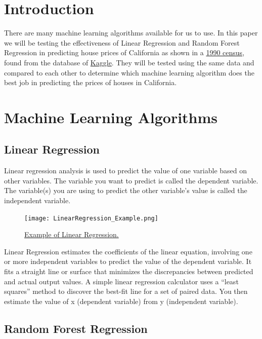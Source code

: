\documentclass{article}
\begin{document}
\section{Introduction}

There are many machine learning algorithms available for us to use. In this paper we will be testing the effectiveness of Linear Regression and Random Forest Regression in predicting house prices of California as shown in a \href{https://www.kaggle.com/datasets/camnugent/california-housing-prices?datasetId=5227}{1990 census}, found from the database of \href{https://www.kaggle.com/}{Kaggle}. They will be tested using the same data and compared to each other to determine which machine learning algorithm does the best job in predicting the prices of houses in California.

\section{Machine Learning Algorithms}

\subsection{Linear Regression}

Linear regression analysis is used to predict the value of one variable based on other variables. The variable you want to predict is called the dependent variable. The variable(s) you are using to predict the other variable's value is called the independent variable.

\begin{figure}[H]
\centering
\texttt{[image: LinearRegression\_Example.png]}
\caption{\label{fig:LinearRegression_Example}\href{https://data-science-blog.com/blog/2022/05/02/understanding-linear-regression-with-all-statistical-terms/}{Example of Linear Regression.}}
\end{figure}

Linear Regression estimates the coefficients of the linear equation, involving one or more independent variables to predict the value of the dependent variable. It fits a straight line or surface that minimizes the discrepancies between predicted and actual output values. A simple linear regression calculator uses a “least squares” method to discover the best-fit line for a set of paired data. You then estimate the value of x (dependent variable) from y (independent variable).

\subsection{Random Forest Regression}
\end{document}
